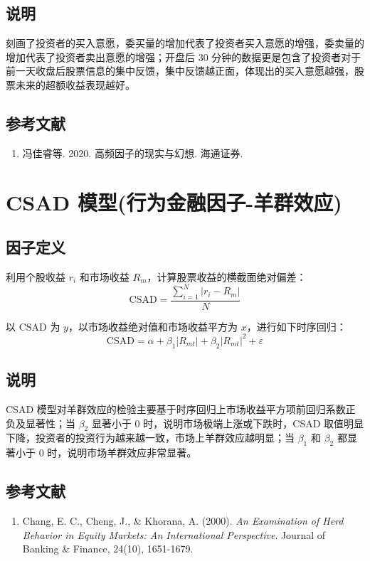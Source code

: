 \documentclass{article}
\begin{document}
\subsection{说明}
刻画了投资者的买入意愿，委买量的增加代表了投资者买入意愿的增强，委卖量的增加代表了投资者卖出意愿的增强；开盘后 30 分钟的数据更是包含了投资者对于前一天收盘后股票信息的集中反馈，集中反馈越正面，体现出的买入意愿越强，股票未来的超额收益表现越好。

\subsection{参考文献}
\begin{enumerate}
    \item 冯佳睿等. 2020. 高频因子的现实与幻想. 海通证券.
\end{enumerate}

\section{CSAD 模型(行为金融因子-羊群效应)}

\subsection{因子定义}
利用个股收益 \( r_i \) 和市场收益 \( R_m \)，计算股票收益的横截面绝对偏差：
\begin{equation}
    \mathrm{CSAD} = \frac{\sum_{i=1}^N |r_i - R_m|}{N}
\end{equation}

以 \( \mathrm{CSAD} \) 为 \( y \)，以市场收益绝对值和市场收益平方为 \( x \)，进行如下时序回归：
\begin{equation}
    \mathrm{CSAD} = \alpha + \beta_1 |R_{mt}| + \beta_2 |R_{mt}|^2 + \varepsilon
\end{equation}

\subsection{说明}
CSAD 模型对羊群效应的检验主要基于时序回归上市场收益平方项前回归系数正负及显著性；当 \( \beta_2 \) 显著小于 0 时，说明市场极端上涨或下跌时，CSAD 取值明显下降，投资者的投资行为越来越一致，市场上羊群效应越明显；当 \( \beta_1 \) 和 \( \beta_2 \) 都显著小于 0 时，说明市场羊群效应非常显著。

\subsection{参考文献}
\begin{enumerate}
    \item Chang, E. C., Cheng, J., \& Khorana, A. (2000). \textit{An Examination of Herd Behavior in Equity Markets: An International Perspective}. Journal of Banking \& Finance, 24(10), 1651-1679.
\end{enumerate}
\end{document}
